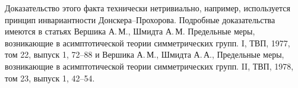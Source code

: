 \begin{remark}
Доказательство этого факта технически нетривиально, например, используется принцип инвариантности 
Донскера--Прохорова.  
Подробные доказательства имеются в статьях Вершика А.\,М., Шмидта А.\,М.  Предельные меры, возникающие в асимптотической теории симметрических групп. I, ТВП, 1977, том 22, выпуск 1, 72–88 и Вершика  А.\,М., Шмидта А.\,А., Предельные меры, возникающие в асимптотической теории симметрических групп. II, ТВП, 1978, том 23, выпуск 1, 42–54. 



\end{remark}


